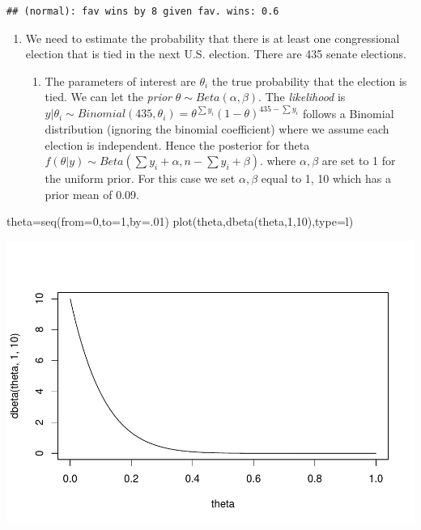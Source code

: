 \documentclass[
]{book}
\newenvironment{Shaded}{\begin{snugshade}}{\end{snugshade}}
\newcommand{\AttributeTok}[1]{\textcolor[rgb]{0.77,0.63,0.00}{#1}}
\newcommand{\DecValTok}[1]{\textcolor[rgb]{0.00,0.00,0.81}{#1}}
\newcommand{\FunctionTok}[1]{\textcolor[rgb]{0.00,0.00,0.00}{#1}}
\newcommand{\NormalTok}[1]{#1}
\newcommand{\OtherTok}[1]{\textcolor[rgb]{0.56,0.35,0.01}{#1}}
\newcommand{\StringTok}[1]{\textcolor[rgb]{0.31,0.60,0.02}{#1}}
\providecommand{\tightlist}{%
  \setlength{\itemsep}{0pt}\setlength{\parskip}{0pt}}
\theoremstyle{definition}
\theoremstyle{definition}
\theoremstyle{definition}
\theoremstyle{definition}
\theoremstyle{remark}
\begin{document}
\begin{verbatim}
## (normal): fav wins by 8 given fav. wins: 0.6
\end{verbatim}

\begin{enumerate}
\def\labelenumi{\arabic{enumi}.}
\setcounter{enumi}{4}
\tightlist
\item
  We need to estimate the probability that there is at least one congressional election that is tied in the next U.S. election. There are 435 senate elections.

  \begin{enumerate}
  \def\labelenumii{(\alph{enumii})}
  \tightlist
  \item
    The parameters of interest are \(\theta_i\) the true probability that the election is tied. We can let the \emph{prior} \(\theta \sim Beta(\alpha,\beta)\). The \emph{likelihood} is \(y|\theta_i \sim Binomial(435,\theta_i) = \theta^{\sum y_i}(1-\theta)^{435-\sum y_i}\) follows a Binomial distribution (ignoring the binomial coefficient) where we assume each election is independent. Hence the posterior for theta \(f(\theta | y) \sim Beta(\sum y_i +\alpha, n-\sum y_i +\beta)\). where \(\alpha,\beta\) are set to 1 for the uniform prior. For this case we set \(\alpha, \beta\) equal to 1, 10 which has a prior mean of 0.09.
  \end{enumerate}
\end{enumerate}

\begin{Shaded}
\begin{Highlighting}[]
\NormalTok{theta}\OtherTok{=}\FunctionTok{seq}\NormalTok{(}\AttributeTok{from=}\DecValTok{0}\NormalTok{,}\AttributeTok{to=}\DecValTok{1}\NormalTok{,}\AttributeTok{by=}\NormalTok{.}\DecValTok{01}\NormalTok{)}
\FunctionTok{plot}\NormalTok{(theta,}\FunctionTok{dbeta}\NormalTok{(theta,}\DecValTok{1}\NormalTok{,}\DecValTok{10}\NormalTok{),}\AttributeTok{type=}\StringTok{\textquotesingle{}l\textquotesingle{}}\NormalTok{)}
\end{Highlighting}
\end{Shaded}

\includegraphics{_main_files/figure-latex/unnamed-chunk-6-1.pdf}
\end{document}
